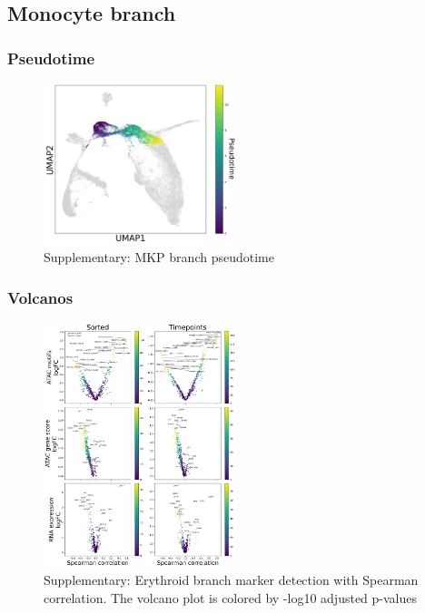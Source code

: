 \documentclass[a4paper]{article}
\begin{document}
\FloatBarrier
\subsection{Monocyte branch}

\subsubsection{Pseudotime}
\begin{figure}[!htb]
  \centering
  \includegraphics[width=0.5\textwidth]{../figures/hematopoiesis/Monocyte_40_15_single_branch_pseudotime.png}
  \caption{Supplementary: MKP branch pseudotime}
\end{figure}

\FloatBarrier
\subsubsection{Volcanos}

\begin{figure}[!htb]
  \centering
  \includegraphics[width=0.5\textwidth]{../figures/hematopoiesis/Monocyte_40_15_smooth_none_single_branch_volcanos_motifs.png}
  \caption{Supplementary: Erythroid branch marker detection with Spearman correlation. The volcano plot is colored by -log10 adjusted p-values}
\end{figure}
\end{document}

